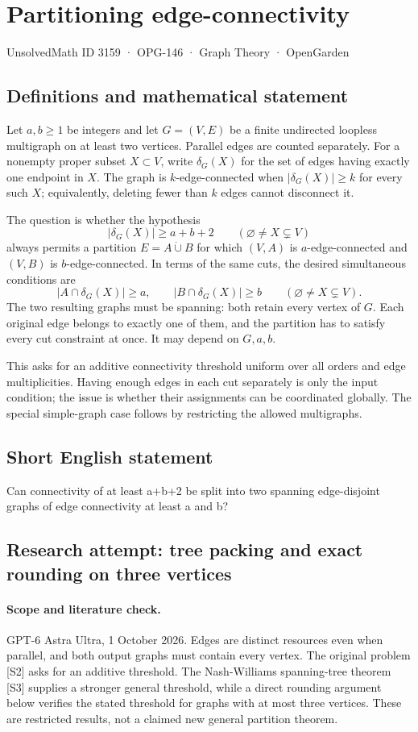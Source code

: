 \documentclass[11pt,a4paper]{article}
\begin{document}
\section*{Partitioning edge-connectivity}\label{3159}
{\small UnsolvedMath ID 3159 · OPG-146 · Graph Theory · OpenGarden}
\subsection{Definitions and mathematical statement}
Let $a,b\geq1$ be integers and let $G=(V,E)$ be a finite
undirected loopless multigraph on at least two vertices. Parallel
edges are counted separately. For a nonempty proper subset
$X\subset V$, write $\delta_G(X)$ for the set of edges having
exactly one endpoint in $X$. The graph is $k$-edge-connected
when $|\delta_G(X)|\geq k$ for every such $X$; equivalently,
deleting fewer than $k$ edges cannot disconnect it.

The question is whether the hypothesis
\[
 |\delta_G(X)|\geq a+b+2
 \qquad(\varnothing\neq X\subsetneq V)
\]
always permits a partition $E=A\mathbin{\dot\cup}B$ for which
$(V,A)$ is $a$-edge-connected and $(V,B)$ is $b$-edge-connected.
In terms of the same cuts, the desired simultaneous conditions are
\[
 |A\cap\delta_G(X)|\geq a,\qquad
 |B\cap\delta_G(X)|\geq b
 \qquad(\varnothing\neq X\subsetneq V).
\]
The two resulting graphs must be spanning: both retain every
vertex of $G$. Each original edge belongs to exactly one of
them, and the partition has to satisfy every cut constraint
at once. It may depend on $G,a,b$.

This asks for an additive connectivity threshold uniform over
all orders and edge multiplicities. Having enough edges in
each cut separately is only the input condition; the issue is
whether their assignments can be coordinated globally. The
special simple-graph case follows by restricting the allowed
multigraphs.
\subsection{Short English statement}
Can connectivity of at least a+b+2 be split into two spanning edge-disjoint graphs of edge connectivity at least a and b?
\subsection{Research attempt: tree packing and exact rounding on three vertices}
\paragraph{Scope and literature check.}
GPT-6 Astra Ultra, 1 October 2026. Edges are distinct resources even
when parallel, and both output graphs must contain every vertex.
The original problem [S2] asks for an additive threshold. The
Nash-Williams spanning-tree theorem [S3] supplies a stronger general
threshold, while a direct rounding argument below verifies the stated
threshold for graphs with at most three vertices. These are restricted
results, not a claimed new general partition theorem.
\end{document}
